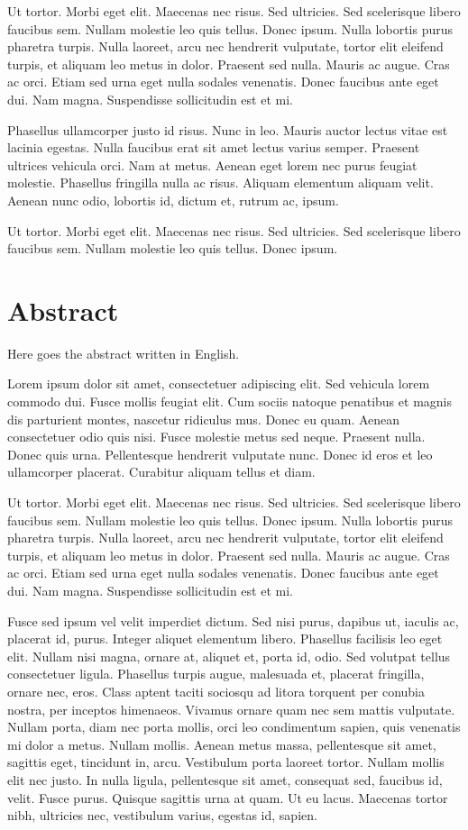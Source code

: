 Ut tortor. Morbi eget elit. Maecenas nec risus. Sed ultricies. Sed
scelerisque libero faucibus sem. Nullam molestie leo quis
tellus. Donec ipsum. Nulla lobortis purus pharetra turpis. Nulla
laoreet, arcu nec hendrerit vulputate, tortor elit eleifend turpis, et
aliquam leo metus in dolor. Praesent sed nulla. Mauris ac augue. Cras
ac orci. Etiam sed urna eget nulla sodales venenatis. Donec faucibus
ante eget dui. Nam magna. Suspendisse sollicitudin est et mi.

Phasellus ullamcorper justo id risus. Nunc in leo. Mauris auctor
lectus vitae est lacinia egestas. Nulla faucibus erat sit amet lectus
varius semper. Praesent ultrices vehicula orci. Nam at metus. Aenean
eget lorem nec purus feugiat molestie. Phasellus fringilla nulla ac
risus. Aliquam elementum aliquam velit. Aenean nunc odio, lobortis id,
dictum et, rutrum ac, ipsum.

Ut tortor. Morbi eget elit. Maecenas nec risus. Sed ultricies. Sed
scelerisque libero faucibus sem. Nullam molestie leo quis
tellus. Donec ipsum.

\chapter*{Abstract}

Here goes the abstract written in English.

Lorem ipsum dolor sit amet, consectetuer adipiscing elit. Sed vehicula
lorem commodo dui. Fusce mollis feugiat elit. Cum sociis natoque
penatibus et magnis dis parturient montes, nascetur ridiculus
mus. Donec eu quam. Aenean consectetuer odio quis nisi. Fusce molestie
metus sed neque. Praesent nulla. Donec quis urna. Pellentesque
hendrerit vulputate nunc. Donec id eros et leo ullamcorper
placerat. Curabitur aliquam tellus et diam.

Ut tortor. Morbi eget elit. Maecenas nec risus. Sed ultricies. Sed
scelerisque libero faucibus sem. Nullam molestie leo quis
tellus. Donec ipsum. Nulla lobortis purus pharetra turpis. Nulla
laoreet, arcu nec hendrerit vulputate, tortor elit eleifend turpis, et
aliquam leo metus in dolor. Praesent sed nulla. Mauris ac augue. Cras
ac orci. Etiam sed urna eget nulla sodales venenatis. Donec faucibus
ante eget dui. Nam magna. Suspendisse sollicitudin est et mi.

Fusce sed ipsum vel velit imperdiet dictum. Sed nisi purus, dapibus
ut, iaculis ac, placerat id, purus. Integer aliquet elementum
libero. Phasellus facilisis leo eget elit. Nullam nisi magna, ornare
at, aliquet et, porta id, odio. Sed volutpat tellus consectetuer
ligula. Phasellus turpis augue, malesuada et, placerat fringilla,
ornare nec, eros. Class aptent taciti sociosqu ad litora torquent per
conubia nostra, per inceptos himenaeos. Vivamus ornare quam nec sem
mattis vulputate. Nullam porta, diam nec porta mollis, orci leo
condimentum sapien, quis venenatis mi dolor a metus. Nullam
mollis. Aenean metus massa, pellentesque sit amet, sagittis eget,
tincidunt in, arcu. Vestibulum porta laoreet tortor. Nullam mollis
elit nec justo. In nulla ligula, pellentesque sit amet, consequat sed,
faucibus id, velit. Fusce purus. Quisque sagittis urna at quam. Ut eu
lacus. Maecenas tortor nibh, ultricies nec, vestibulum varius, egestas
id, sapien.

